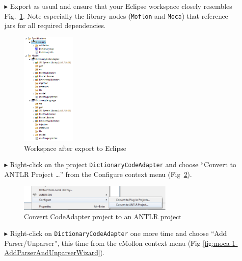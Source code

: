 \begin{enumerate}
\item[$\blacktriangleright$] Export as usual and ensure that your Eclipse workspace closely resembles Fig.~\ref{fig:moca-6-ExportToEclipse}.
Note especially the library nodes (\texttt{Moflon} and \texttt{Moca}) that reference jars for all required dependencies.

\begin{figure}[!htbp]
\begin{center}
 \includegraphics[width=0.25\textwidth]{pics/moca/1DictionaryMetaModel/6-ExportToEclipse}
  \caption{Workspace after export to Eclipse}
  \label{fig:moca-6-ExportToEclipse}
\end{center}
\end{figure}

\item[$\blacktriangleright$] Right-click on the project
\texttt{DictionaryCodeAdapter} and choose ``Convert to ANTLR Project \ldots'' from the Configure context menu (Fig~\ref{fig:moca-0-ConvertToANTLRProject.jpg}).

\begin{figure}[!htbp]
\begin{center}
 \includegraphics[width=0.72\textwidth]{pics/moca/2TextToMocaTree/0-ConvertToANTLRProject.jpg}
  \caption{Convert CodeAdapter project to an ANTLR project} 
  \label{fig:moca-0-ConvertToANTLRProject.jpg}
\end{center} 
\end{figure} 

\item[$\blacktriangleright$] Right-click on \texttt{DictionaryCodeAdapter} one more time and choose ``Add Parser/Unparser'', this time from the eMoflon context menu (Fig \ref{fig:moca-1-AddParserAndUnparserWizard}).


\end{enumerate}

